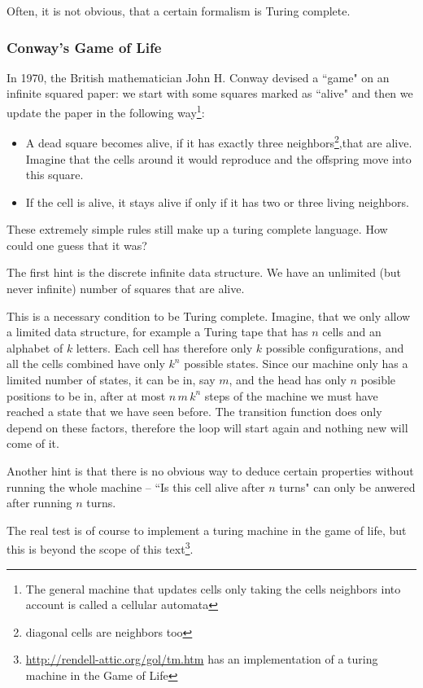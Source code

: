 Often, it is not obvious, that a certain formalism is Turing complete.

\subsubsection{Conway's Game of Life}
In 1970, the British mathematician John H. Conway devised a ``game" on an 
infinite squared paper: we start with some squares marked as ``alive" and 
then we update the paper in the following way\footnote{The general machine 
	that updates cells only taking the cells neighbors into account is called a 
cellular automata}:

\begin{itemize}
	\item A dead square becomes alive, if it has exactly three 
		neighbors\footnote{diagonal cells are neighbors too},that 
		are alive. Imagine that the cells around it would reproduce and the 
		offspring move into this square.
	\item If the cell is alive, it stays alive if only if it has two or three 
		living neighbors.
\end{itemize}

These extremely simple rules still make up a turing complete language. How 
could one guess that it was?

The first hint is the discrete infinite data structure. We have an unlimited (but 
never infinite) number of squares that are alive. 

This is a necessary condition to be Turing complete. Imagine, that we only
allow a limited data structure, for example a Turing tape that has $n$ cells
and an alphabet of $k$ letters. Each cell has therefore only $k$ possible
configurations, and all the cells combined have only $k^n$ possible states.
Since our machine only has a limited number of states, it can be in, say $m$,
and the head has only $n$ posible positions to be in, after at most 
$n\, m\, k^n$ steps of the machine we must have reached a state that we have
seen before.  The transition function does only depend on these factors,
therefore the loop will start again and nothing new will come of it.

Another hint is that there is no obvious way to deduce certain properties 
without running the whole machine -- ``Is this cell alive after $n$ turns" 
can only be anwered after running $n$ turns.

The real test is of course to implement a turing machine in the game of life, 
but this is beyond the scope of this 
text\footnote{\url{http://rendell-attic.org/gol/tm.htm} has an 
implementation of a turing machine in the Game of Life}.

